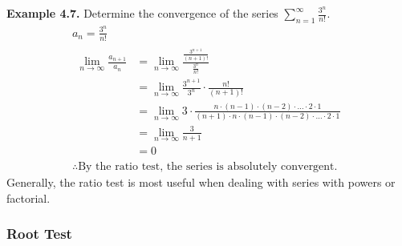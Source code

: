 \documentclass[12pt]{article}
\begin{document}
\textbf{Example 4.7.} Determine the convergence of the series $\displaystyle\sum_{n=1}^{\infty}\frac{3^n}{n!}$.
\begin{gather*}
	a_n = \frac{3^n}{n!}   \\
	\begin{aligned}
		\displaystyle\lim_{n\rightarrow\infty}\frac{a_{n+1}}{a_n} & = \displaystyle\lim_{n\rightarrow\infty}\frac{\frac{3^{n+1}}{(n+1)!}}{\frac{3^n}{n!}}                                                                    \\
		                                                          & = \displaystyle\lim_{n\rightarrow\infty}\frac{3^{n+1}}{3^n}\cdot\frac{n!}{(n+1)!}                                                                        \\
		                                                          & = \displaystyle\lim_{n\rightarrow\infty}3\cdot\frac{n\cdot(n-1)\cdot(n-2)\cdot\dots\cdot2\cdot1}{(n+1)\cdot n\cdot(n-1)\cdot(n-2)\cdot\dots\cdot2\cdot1} \\
		                                                          & = \displaystyle\lim_{n\rightarrow\infty}\frac{3}{n+1}                                                                                                    \\
		                                                          & = 0
	\end{aligned} \\
	\therefore \text{By the ratio test, the series is absolutely convergent.}
\end{gather*}
Generally, the ratio test is most useful when dealing with series with powers or factorial.

\subsubsection{Root Test}
\end{document}
